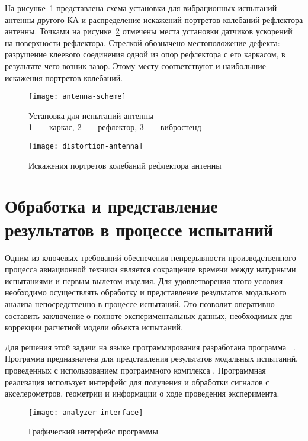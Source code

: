 На рисунке~\ref{fig:antenna-scheme} представлена схема установки для вибрационных испытаний антенны другого КА и распределение искажений портретов колебаний рефлектора антенны. Точками на рисунке~\ref{fig:distortion-antenna} отмечены места установки датчиков ускорений на поверхности рефлектора. Стрелкой обозначено местоположение дефекта: разрушение клеевого соединения одной из опор рефлектора с его каркасом, в результате чего возник зазор. Этому месту соответствуют и наибольшие искажения портретов колебаний.

\begin{figure}[H]
	\centerfloat
	\texttt{[image: antenna-scheme]}
	\caption{Установка для испытаний антенны \\ 1~---~каркас, 2~---~рефлектор, 3~---~вибростенд} \label{fig:antenna-scheme}
\end{figure}

\begin{figure}[H]
	\centerfloat
	\texttt{[image: distortion-antenna]}
	\caption{Искажения портретов колебаний рефлектора антенны} \label{fig:distortion-antenna}
\end{figure}

\section{Обработка и представление результатов в процессе испытаний}

Одним из ключевых требований обеспечения непрерывности производственного процесса авиационной техники является сокращение времени между натурными испытаниями и первым вылетом изделия. Для удовлетворения этого условия необходимо осуществлять обработку и представление результатов модального анализа непосредственно в процессе испытаний. Это позволит оперативно составить заключение о полноте экспериментальных данных, необходимых для коррекции расчетной модели объекта испытаний. 

Для решения этой задачи на языке программирования  разработана программа ~. Программа предназначена для представления результатов модальных испытаний, проведенных с использованием программного комплекса . Программная реализация использует интерфейс  для получения и обработки сигналов с акселерометров, геометрии и информации о ходе проведения эксперимента.

\begin{figure}[!htb]
	\centerfloat
	\texttt{[image: analyzer-interface]}
	\caption{Графический интерфейс программы~} \label{fig:analyzer-interface}
\end{figure}

